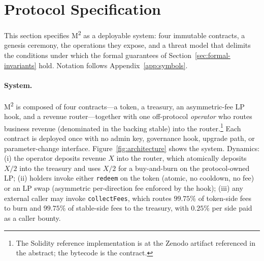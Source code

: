 \section{Protocol Specification}
\label{sec:protocol}

This section specifies M\textsuperscript{2} as a deployable system: four immutable contracts, a genesis ceremony, the operations they expose, and a threat model that delimits the conditions under which the formal guarantees of Section~\ref{sec:formal-invariants} hold. Notation follows Appendix~\ref{app:symbols}.

\paragraph{System.} M\textsuperscript{2} is composed of four contracts---a token, a treasury, an asymmetric-fee LP hook, and a revenue router---together with one off-protocol \emph{operator} who routes business revenue (denominated in the backing stable) into the router.\footnote{The Solidity reference implementation is at the Zenodo artifact referenced in the abstract; the bytecode is the contract.} Each contract is deployed once with no admin key, governance hook, upgrade path, or parameter-change interface. Figure~\ref{fig:architecture} shows the system. Dynamics: (i) the operator deposits revenue $X$ into the router, which atomically deposits $X/2$ into the treasury and uses $X/2$ for a buy-and-burn on the protocol-owned LP; (ii) holders invoke either \texttt{redeem} on the token (atomic, no cooldown, no fee) or an LP swap (asymmetric per-direction fee enforced by the hook); (iii) any external caller may invoke \texttt{collectFees}, which routes $99.75\%$ of token-side fees to burn and $99.75\%$ of stable-side fees to the treasury, with $0.25\%$ per side paid as a caller bounty.

